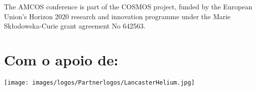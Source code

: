 \begin{center}
The AMCOS conference is part of the COSMOS project, funded by the European Union’s Horizon 2020 research and innovation programme under the Marie Sk\l{}odowska-Curie grant agreement No 642563.
\end{center}

\vfill

\section{Com o apoio de:}

\begin{center}
\texttt{[image: images/logos/Partnerlogos/LancasterHelium.jpg]}
\end{center}

\vfill